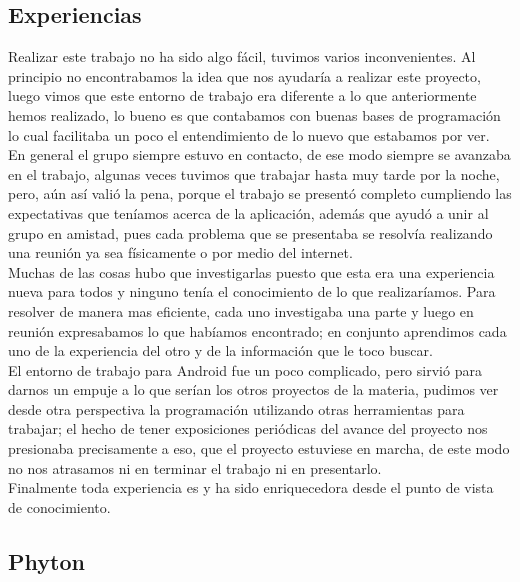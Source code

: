 \documentclass[12pt]{article}
\begin{document}
{{{\begin{flushleft}
\subsection{Experiencias}
Realizar este trabajo no ha sido algo f\'acil, tuvimos varios inconvenientes. Al principio no encontrabamos la idea que nos ayudar\'ia a realizar este proyecto, luego vimos que este entorno de trabajo era diferente a lo que anteriormente hemos realizado, lo bueno es que contabamos con buenas bases de programaci\'on lo cual facilitaba un poco el entendimiento de lo nuevo que estabamos por ver.\\
En general el grupo siempre estuvo en contacto, de ese modo siempre se avanzaba en el trabajo, algunas veces tuvimos que trabajar hasta muy tarde por la noche, pero, a\'un as\'i vali\'o la pena, porque el trabajo se present\'o completo cumpliendo las expectativas que ten\'iamos acerca de la aplicaci\'on, adem\'as que ayud\'o a unir al grupo en amistad, pues cada problema que se presentaba se resolv\'ia realizando una reuni\'on ya sea f\'isicamente o por medio del internet.\\
Muchas de las cosas hubo que investigarlas puesto que esta era una experiencia nueva para todos y ninguno ten\'ia el conocimiento de lo que realizar\'iamos. Para resolver de manera mas eficiente, cada uno investigaba una parte y luego en reuni\'on expresabamos lo que hab\'iamos encontrado; en conjunto aprendimos cada uno de la experiencia del otro y de la informaci\'on que le toco buscar.\\
El entorno de trabajo para Android fue un poco complicado, pero sirvi\'o para darnos un empuje a lo que ser\'ian los otros proyectos de la materia, pudimos ver desde otra perspectiva la programaci\'on utilizando otras herramientas para trabajar; el hecho de tener exposiciones peri\'odicas del avance del proyecto nos presionaba precisamente a eso, que el proyecto estuviese en marcha, de este modo no nos atrasamos ni en terminar el trabajo ni en presentarlo.\\
\vspace{0.1in}Finalmente toda experiencia es y ha sido enriquecedora desde el punto de vista de conocimiento.

\end{flushleft}

\newpage
\begin{flushleft}
\section{Phyton}
\vspace{0.3in}

\end{flushleft}}}}
\end{document}
